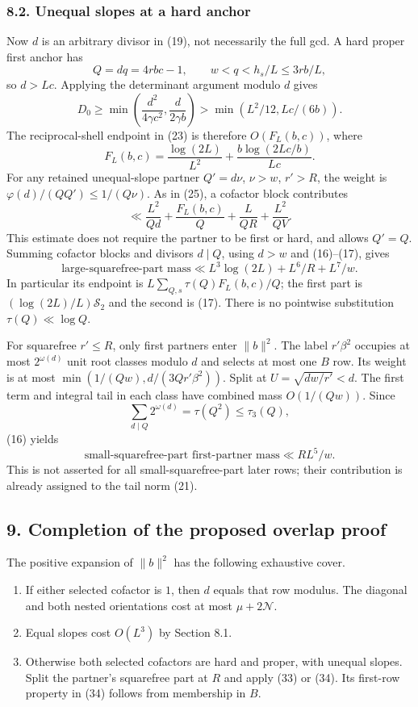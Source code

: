 \documentclass[
  english,
  11pt,
]{article}
\providecommand{\tightlist}{%
  \setlength{\itemsep}{0pt}\setlength{\parskip}{0pt}}
\begin{document}
\subsubsection{8.2. Unequal slopes at a hard
anchor}\label{unequal-slopes-at-a-hard-anchor}

Now \(d\) is an arbitrary divisor in (19), not necessarily the full gcd.
A hard proper first anchor has \[
Q=dq=4rbc-1,\qquad w<q<h_s/L\le3rb/L,
\] so \(d>Lc\). Applying the determinant argument modulo \(d\) gives \[
D_0\ge\min\left(\frac{d^2}{4\gamma c^2},\frac d{2\gamma b}\right)
>\min(L^2/12,Lc/(6b)).
\] The reciprocal-shell endpoint in (23) is therefore \(O(F_L(b,c))\),
where \[
F_L(b,c)=\frac{\log(2L)}{L^2}+\frac{b\log(2Lc/b)}{Lc}. \tag{31}
\] For any retained unequal-slope partner \(Q'=d\nu\), \(\nu>w\),
\(r'>R\), the weight is \(\varphi(d)/(QQ')\le1/(Q\nu)\). As in (25), a
cofactor block contributes \[
\ll\frac{L^2}{Qd}+\frac{F_L(b,c)}Q+\frac{L}{QR}+\frac{L^2}{QV}.
\tag{32}
\] This estimate does not require the partner to be first or hard, and
allows \(Q'=Q\). Summing cofactor blocks and divisors \(d\mid Q\), using
\(d>w\) and (16)--(17), gives \[
\text{large-squarefree-part mass}
\ll L^3\log(2L)+L^6/R+L^7/w. \tag{33}
\] In particular its endpoint is \(L\sum_{Q,s}\tau(Q)F_L(b,c)/Q\); the
first part is \((\log(2L)/L)\mathcal S_2\) and the second is (17). There
is no pointwise substitution \(\tau(Q)\ll\log Q\).

For squarefree \(r'\le R\), only first partners enter \(\|b\|^2\). The
label \(r'\beta^2\) occupies at most \(2^{\omega(d)}\) unit root classes
modulo \(d\) and selects at most one \(B\) row. Its weight is at most
\(\min(1/(Qw),d/(3Qr'\beta^2))\). Split at \(U=\sqrt{dw/r'}<d\). The
first term and integral tail in each class have combined mass
\(O(1/(Qw))\). Since \[
\sum_{d\mid Q}2^{\omega(d)}=\tau(Q^2)\le\tau_3(Q),
\] (16) yields \[
\text{small-squarefree-part first-partner mass}\ll R L^5/w. \tag{34}
\] This is not asserted for all small-squarefree-part later rows; their
contribution is already assigned to the tail norm (21).

\subsection{9. Completion of the proposed overlap
proof}\label{completion-of-the-proposed-overlap-proof}

The positive expansion of \(\|b\|^2\) has the following exhaustive
cover.

\begin{enumerate}
\def\labelenumi{\arabic{enumi}.}
\tightlist
\item
  If either selected cofactor is \(1\), then \(d\) equals that row
  modulus. The diagonal and both nested orientations cost at most
  \(\mu+2\mathcal N\).
\item
  Equal slopes cost \(O(L^3)\) by Section 8.1.
\item
  Otherwise both selected cofactors are hard and proper, with unequal
  slopes. Split the partner's squarefree part at \(R\) and apply (33) or
  (34). Its first-row property in (34) follows from membership in \(B\).
\end{enumerate}
\end{document}

